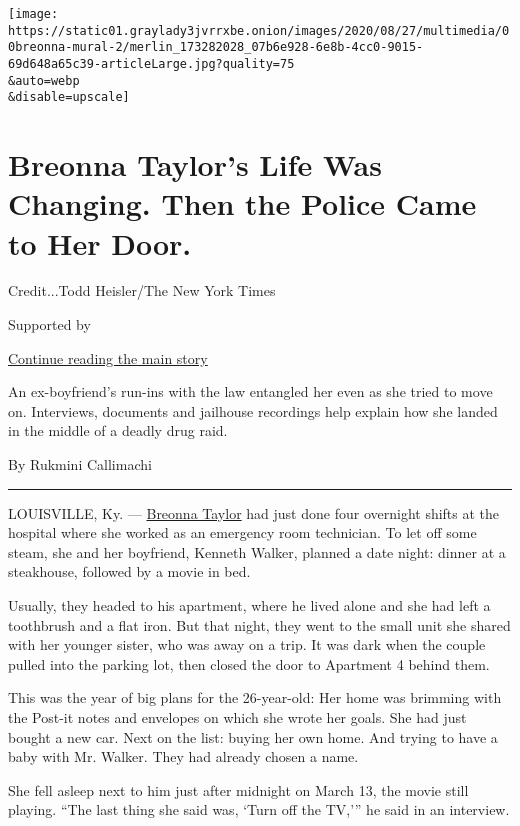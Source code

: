\texttt{[image: https://static01.graylady3jvrrxbe.onion/images/2020/08/27/multimedia/00breonna-mural-2/merlin\_173282028\_07b6e928-6e8b-4cc0-9015-69d648a65c39-articleLarge.jpg?quality=75\\\&auto=webp\\\&disable=upscale]}

\hypertarget{breonna-taylors-life-was-changing-then-the-police-came-to-her-door}{%
\section{Breonna Taylor's Life Was Changing. Then the Police Came to Her
Door.}\label{breonna-taylors-life-was-changing-then-the-police-came-to-her-door}}

Credit...Todd Heisler/The New York Times

Supported by

\protect\hyperlink{after-sponsor}{Continue reading the main story}

An ex-boyfriend's run-ins with the law entangled her even as she tried
to move on. Interviews, documents and jailhouse recordings help explain
how she landed in the middle of a deadly drug raid.

By Rukmini Callimachi

\begin{center}\rule{0.5\linewidth}{\linethickness}\end{center}

LOUISVILLE, Ky. ---
\href{https://www.nytimes3xbfgragh.onion/article/breonna-taylor-police.html}{Breonna
Taylor} had just done four overnight shifts at the hospital where she
worked as an emergency room technician. To let off some steam, she and
her boyfriend, Kenneth Walker, planned a date night: dinner at a
steakhouse, followed by a movie in bed.

Usually, they headed to his apartment, where he lived alone and she had
left a toothbrush and a flat iron. But that night, they went to the
small unit she shared with her younger sister, who was away on a trip.
It was dark when the couple pulled into the parking lot, then closed the
door to Apartment 4 behind them.

This was the year of big plans for the 26-year-old: Her home was
brimming with the Post-it notes and envelopes on which she wrote her
goals. She had just bought a new car. Next on the list: buying her own
home. And trying to have a baby with Mr. Walker. They had already chosen
a name.

She fell asleep next to him just after midnight on March 13, the movie
still playing. ``The last thing she said was, `Turn off the TV,''' he
said in an interview.

